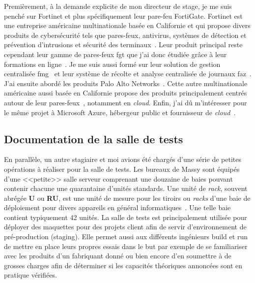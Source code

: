 \documentclass[12pt, oneside, a4paper, titlepage]{report}
\begin{document}
Premièrement, à la demande explicite de mon directeur de stage, je me suis
penché sur Fortinet et plus spécifiquement leur pare-feu FortiGate.  Fortinet
est une entreprise américaine multinationale basée en Californie et qui propose
divers produits de cybersécurité tels que pares-feux, antivirus, systèmes de
détection et prévention d'intrusions et sécurité des terminaux~\cite{forti}.
Leur produit principal reste cependant leur gamme de pares-feux \gls{fgt} que
j'ai donc étudiée grâce à leur formations en ligne~\cite{fgt}. Je me suis aussi
formé sur leur solution de gestion centralisée \gls{fmg}~\cite{fmg} et leur
système de récolte et analyse centralisée de journaux \gls{faz}~\cite{faz}. J'ai
ensuite abordé les produits Palo Alto Networks~\cite{pan}. Cette autre
multinationale américaine aussi basée en Californie propose des produits
principalement centrés autour de leur pares-feux~\cite{pan-pa}, notamment en
\textit{cloud}. Enfin, j'ai dû m'intéresser pour le même projet à Microsoft
Azure, hébergeur public et fournisseur de \textit{cloud}~\cite{azure}.

\subsection{Documentation de la salle de tests}%
\label{sub:mission::prems::doc-salle-tests}

En parallèle, un autre stagiaire et moi avions été chargés d'une série de
petites opérations à réaliser pour la salle de tests. Les bureaux de Massy sont
équipés d'une <<petite>> salle serveur comprenant une douzaine de baies pouvant
contenir chacune une quarantaine d'unités standards. Une unité de \textit{rack},
souvent abrégée \textbf{U} ou \textbf{RU}, est une unité de mesure pour les
tiroirs ou \textit{racks} d'une baie de déploiement pour divers appareils en
général informatiques~\cite{rack-unit}. Une telle baie contient typiquement 42
unités. La salle de tests est principalement utilisée pour déployer des
maquettes pour des projets client afin de servir d'environnement de
pré-production (\gls{staging}).  Elle permet aussi aux différents ingénieurs
\gls{build} et \gls{run} de mettre en place leurs propres essais dans le but par
exemple de se familiariser avec les produits d'un fabriquant donné ou bien
encore d'en soumettre à de grosses charges afin de déterminer si les capacités
théoriques annoncées sont en pratique vérifiées.
\end{document}
